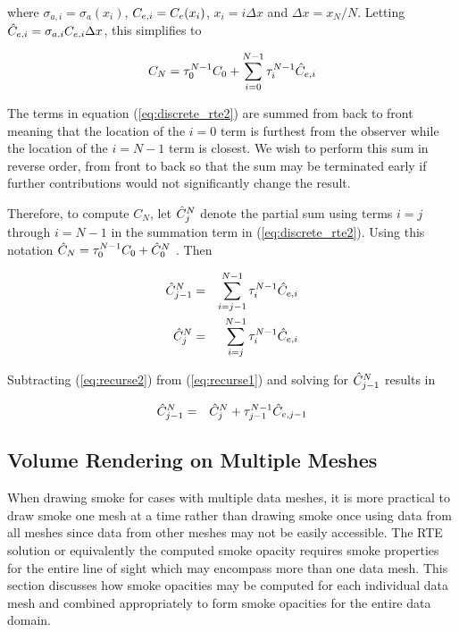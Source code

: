 where $\sigma_{a,i}=\sigma_a(x_i)$, $C_{e,i}=C_e(x_i)$, $x_i=i\Delta x$ and $\Delta x=x_N/N$.
Letting $\hat{C}_{e,i}=\sigma_{a,i}C_{e,i}\Delta x$, this simplifies to

\begin{equation}
\label{eq:discrete_rte2}
C_N = \tau_{0}^{N-1}C_0 + \sum_{i=0}^{N-1}\tau_{i}^{N-1}\hat{C}_{e,i}
\end{equation}

The terms in equation (\ref{eq:discrete_rte2}) are summed from back to front meaning that the location of the $i=0$ term is furthest from the observer while the location of the $i=N-1$ term is closest.  We wish to perform this sum in reverse order, from front to back so that the sum may be terminated early if further contributions would not significantly change the result.

Therefore, to compute $C_N$, let $\hat{C}_{j}^N$ denote the partial sum using terms $i=j$ through $i=N-1$ in the summation term in (\ref{eq:discrete_rte2}).  Using this notation $\hat{C}_N=\tau_{0}^{N-1}C_0+\hat{C}_{0}^N$ . Then

\begin{eqnarray}
\label{eq:recurse1}
\hat{C}_{j-1}^N &= &\sum_{i=j-1}^{N-1}\tau_{i}^{N-1}\hat{C}_{e,i}\\
\label{eq:recurse2}
\hat{C}_{j}^N     &= &\sum_{i=j}^{N-1}  \tau_{i}^{N-1}\hat{C}_{e,i}
\end{eqnarray}

Subtracting (\ref{eq:recurse2}) from (\ref{eq:recurse1}) and solving for $\hat{C}_{j-1}^N$ results in

\begin{eqnarray*}
\hat{C}_{j-1}^N&=&\hat{C}_{j}^N+\tau_{j-1}^{N-1}\hat{C}_{e,j-1}
\end{eqnarray*}

%
%

\subsection{Volume Rendering on Multiple Meshes}
When drawing smoke for cases with multiple data meshes, it is more practical to draw smoke one mesh at a time rather than drawing smoke once using data from all meshes since data from other meshes may not be easily accessible.  The RTE solution or equivalently the computed smoke opacity requires smoke properties for the entire line of sight which may encompass more than one data mesh.  This section discusses how smoke opacities may be computed for each individual data mesh and combined appropriately to form smoke opacities for the entire data domain.

